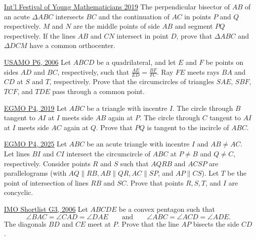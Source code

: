 \begin{problem}{4}{\href{https://artofproblemsolving.com/community/q2h1920217p35604706}{Int'l Festival of Young Mathematicians 2019}} 
	The perpendicular bisector of $AB$ of an acute $\Delta ABC$ intersects $BC$ and the continuation of $AC$ in points $P$ and $Q$ respectively. $M$ and $N$ are the middle points of side $AB$ and segment $PQ$ respectively. If the lines $AB$ and $CN$ intersect in point $D$, prove that $\Delta ABC$ and $\Delta DCM$ have a common orthocenter.
\end{problem}

\begin{problem}{5}{\href{https://artofproblemsolving.com/community/q2h84559p35507946}{USAMO P6, 2006}} 
	Let $ABCD$ be a quadrilateral, and let $E$ and $F$ be points on sides $AD$ and $BC$, respectively, such that $\frac{AE}{ED} = \frac{BF}{FC}$. Ray $FE$ meets rays $BA$ and $CD$ at $S$ and $T$, respectively. Prove that the circumcircles of triangles $SAE$, $SBF$, $TCF$, and $TDE$ pass through a common point.
\end{problem}

\begin{problem}{6}{\href{https://artofproblemsolving.com/community/q2h1819300p35507923}{EGMO P4, 2019}} 
	Let $ABC$ be a triangle with incentre $I$. The circle through $B$ tangent to $AI$ at $I$ meets side $AB$ again at $P$. The circle through $C$ tangent to $AI$ at $I$ meets side $AC$ again at $Q$. Prove that $PQ$ is tangent to the incircle of $ABC$.
\end{problem}

\begin{problem}{7}{\href{https://artofproblemsolving.com/community/q2h3548106p35507758}{EGMO P4, 2025}} 
	Let $ABC$ be an acute triangle with incentre $I$ and $AB \neq AC$. Let lines $BI$ and $CI$ intersect the circumcircle of $ABC$ at $P \neq B$ and $Q \neq C$, respectively. Consider points $R$ and $S$ such that $AQRB$ and $ACSP$ are parallelograms (with $AQ \parallel RB, AB \parallel QR, AC \parallel SP$, and $AP \parallel CS$). Let $T$ be the point of intersection of lines $RB$ and $SC$. Prove that points $R, S, T$, and $I$ are concyclic.
\end{problem}

\begin{problem}{8}{\href{https://artofproblemsolving.com/community/q2h130813p35493023}{IMO Shortlist G3, 2006}} 
	Let $ ABCDE$ be a convex pentagon such that
\[ \angle BAC = \angle CAD = \angle DAE\qquad \text{and}\qquad \angle ABC = \angle ACD = \angle ADE. \]The diagonals $BD$ and $CE$ meet at $P$. Prove that the line $AP$ bisects the side $CD$.
\end{problem}

